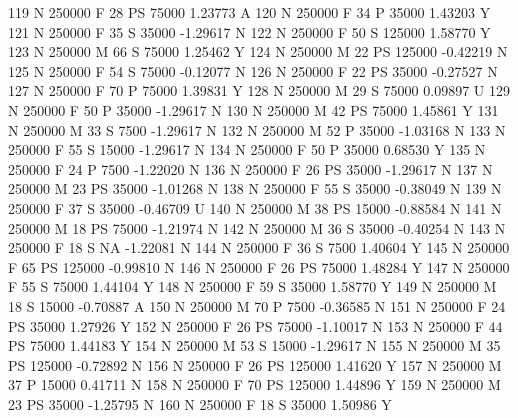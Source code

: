 \documentclass{article}
\begin{document}
\begin{Schunk}
\begin{Soutput}
119       N     250000   F  28        PS  75000   1.23773    A
120       N     250000   F  34         P  35000   1.43203    Y
121       N     250000   F  35         S  35000  -1.29617    N
122       N     250000   F  50         S 125000   1.58770    Y
123       N     250000   M  66         S  75000   1.25462    Y
124       N     250000   M  22        PS 125000  -0.42219    N
125       N     250000   F  54         S  75000  -0.12077    N
126       N     250000   F  22        PS  35000  -0.27527    N
127       N     250000   F  70         P  75000   1.39831    Y
128       N     250000   M  29         S  75000   0.09897    U
129       N     250000   F  50         P  35000  -1.29617    N
130       N     250000   M  42        PS  75000   1.45861    Y
131       N     250000   M  33         S   7500  -1.29617    N
132       N     250000   M  52         P  35000  -1.03168    N
133       N     250000   F  55         S  15000  -1.29617    N
134       N     250000   F  50         P  35000   0.68530    Y
135       N     250000   F  24         P   7500  -1.22020    N
136       N     250000   F  26        PS  35000  -1.29617    N
137       N     250000   M  23        PS  35000  -1.01268    N
138       N     250000   F  55         S  35000  -0.38049    N
139       N     250000   F  37         S  35000  -0.46709    U
140       N     250000   M  38        PS  15000  -0.88584    N
141       N     250000   M  18        PS  75000  -1.21974    N
142       N     250000   M  36         S  35000  -0.40254    N
143       N     250000   F  18         S     NA  -1.22081    N
144       N     250000   F  36         S   7500   1.40604    Y
145       N     250000   F  65        PS 125000  -0.99810    N
146       N     250000   F  26        PS  75000   1.48284    Y
147       N     250000   F  55         S  75000   1.44104    Y
148       N     250000   F  59         S  35000   1.58770    Y
149       N     250000   M  18         S  15000  -0.70887    A
150       N     250000   M  70         P   7500  -0.36585    N
151       N     250000   F  24        PS  35000   1.27926    Y
152       N     250000   F  26        PS  75000  -1.10017    N
153       N     250000   F  44        PS  75000   1.44183    Y
154       N     250000   M  53         S  15000  -1.29617    N
155       N     250000   M  35        PS 125000  -0.72892    N
156       N     250000   F  26        PS 125000   1.41620    Y
157       N     250000   M  37         P  15000   0.41711    N
158       N     250000   F  70        PS 125000   1.44896    Y
159       N     250000   M  23        PS  35000  -1.25795    N
160       N     250000   F  18         S  35000   1.50986    Y

\end{Soutput}
\end{Schunk}
\end{document}
